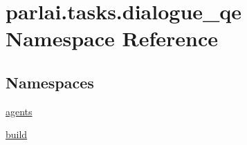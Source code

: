\hypertarget{namespaceparlai_1_1tasks_1_1dialogue__qe}{}\section{parlai.\+tasks.\+dialogue\+\_\+qe Namespace Reference}
\label{namespaceparlai_1_1tasks_1_1dialogue__qe}
\subsection*{Namespaces}
\begin{DoxyCompactItemize}
\item 
 \hyperlink{namespaceparlai_1_1tasks_1_1dialogue__qe_1_1agents}{agents}
\item 
 \hyperlink{namespaceparlai_1_1tasks_1_1dialogue__qe_1_1build}{build}
\end{DoxyCompactItemize}
